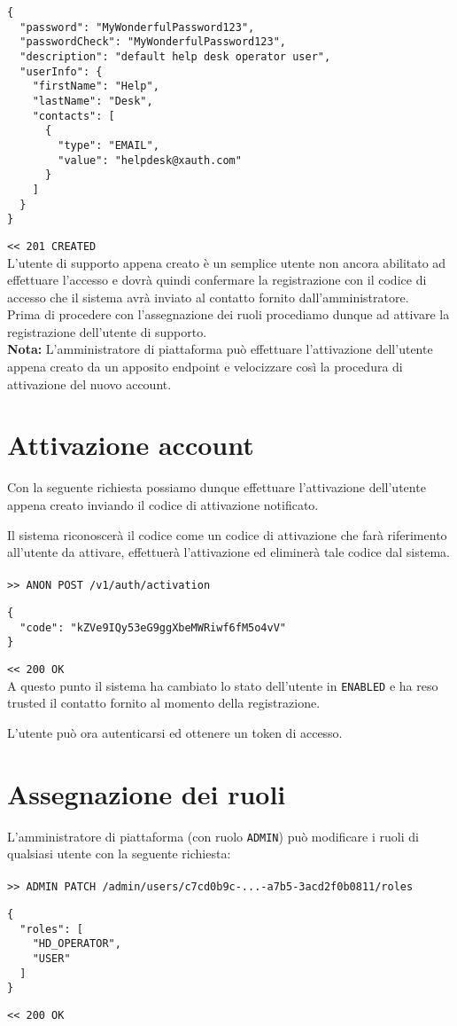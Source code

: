 \documentclass[a4paper,12pt]{article}
\begin{document}
\begin{lstlisting}
{
  "password": "MyWonderfulPassword123",
  "passwordCheck": "MyWonderfulPassword123",
  "description": "default help desk operator user",
  "userInfo": {
    "firstName": "Help",
    "lastName": "Desk",
    "contacts": [
      {
        "type": "EMAIL",
        "value": "helpdesk@xauth.com"
      }
    ]
  }
}
\end{lstlisting}
\texttt{<< 201 CREATED} \\

L’utente di supporto appena creato è un semplice utente non ancora abilitato ad effettuare l’accesso e dovrà quindi confermare la registrazione con il codice di accesso che il sistema avrà inviato al contatto fornito dall’amministratore. \\

Prima di procedere con l’assegnazione dei ruoli procediamo dunque ad attivare la registrazione dell’utente di supporto. \\

\textbf{Nota:} L’amministratore di piattaforma può effettuare l’attivazione dell’utente appena creato da un apposito endpoint e velocizzare così la procedura di attivazione del nuovo account.


\section{Attivazione account}

Con la seguente richiesta possiamo dunque effettuare l’attivazione dell’utente appena creato inviando il codice di attivazione notificato.

Il sistema riconoscerà il codice come un codice di attivazione che farà riferimento all’utente da attivare, effettuerà l’attivazione ed eliminerà tale codice dal sistema. \\
\\
\texttt{>> ANON POST /v1/auth/activation}
\begin{lstlisting}
{
  "code": "kZVe9IQy53eG9ggXbeMWRiwf6fM5o4vV"
}
\end{lstlisting}
\texttt{<< 200 OK} \\

A questo punto il sistema ha cambiato lo stato dell’utente in \texttt{ENABLED} e ha reso trusted il contatto fornito al momento della registrazione.

L’utente può ora autenticarsi ed ottenere un token di accesso.


\section{Assegnazione dei ruoli}
L’amministratore di piattaforma (con ruolo \texttt{ADMIN}) può modificare i ruoli di qualsiasi utente con la seguente richiesta: \\
\\
\texttt{>> ADMIN PATCH /admin/users/c7cd0b9c-...-a7b5-3acd2f0b0811/roles}
\begin{lstlisting}
{
  "roles": [
    "HD_OPERATOR",
    "USER"
  ]
}
\end{lstlisting}
\texttt{<< 200 OK} \\
\end{document}
